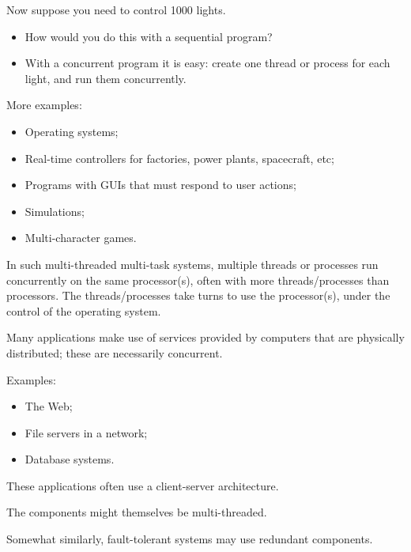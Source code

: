 Now suppose you need to control 1000 lights.  
%
\begin{itemize}
\item
How would you do this with a sequential program?

\item
With a concurrent program it is easy: create one thread or process for each
light, and run them concurrently.
\end{itemize}


More examples:
%
\begin{itemize}
\item
Operating systems;

\item
Real-time controllers for factories, power plants, spacecraft, etc;

\item
Programs with GUIs that must respond to user actions;

\item
Simulations;

\item
Multi-character games.
\end{itemize}

In such multi-threaded multi-task systems, multiple threads or processes run
concurrently on the same processor(s), often with more threads/processes than
processors.  The threads/processes take turns to use the processor(s), under
the control of the operating system.



Many applications make use of services provided by computers that are
physically distributed; these are necessarily concurrent.

Examples:
%
\begin{itemize}
\item 
The Web;

\item
File servers in a network;

\item
Database systems.
\end{itemize}

These applications often use a client-server architecture.

The components might themselves be multi-threaded.

Somewhat similarly, fault-tolerant systems may use redundant components.


